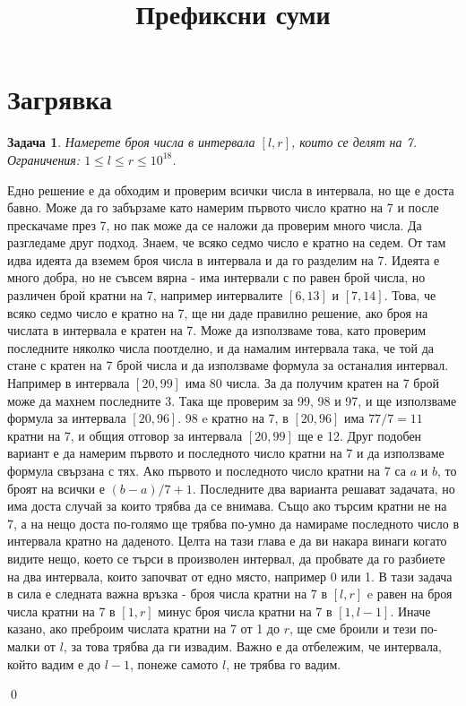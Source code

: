 \documentclass[]{article}
\title{Префиксни суми}
\author{}
\newtheorem{problem}{Задача}
\newenvironment{solution}{\noindent{\bf Решение.}\hspace*{1em}}{\qed\par}
\begin{document}
\maketitle

\section{Загрявка}
\begin{problem}
Намерете броя числа в интервала $[l, r]$, които се делят на 7.\newline
Ограничения: $1\leq l\leq r\leq 10^{18}$.
\end{problem}
\begin{solution}
\newline
Едно решение е да обходим и проверим всички числа в интервала, но ще е доста бавно. Може да го забързаме като намерим първото число кратно на 7 и после прескачаме през 7, но пак може да се наложи да проверим много числа.\newline
Да разгледаме друг подход. Знаем, че всяко седмо число е кратно на седем. От там идва идеята да вземем броя числа в интервала и да го разделим на 7. Идеята е много добра, но не съвсем вярна - има интервали с по равен брой числа, но различен брой кратни на 7, например интервалите $[6,13]$ и $[7,14]$. Това, че всяко седмо число е кратно на 7, ще ни даде правилно решение, ако броя на числата в интервала е кратен на 7.
Може да използваме това, като проверим последните няколко числа поотделно, и да намалим интервала така, че той да стане с кратен на 7 брой числа и да използваме формула за останалия интервал. Например в интервала $[20,99]$ има 80 числа. За да получим кратен на 7 брой може да махнем последните 3. Така ще проверим за 99, 98 и 97, и ще използваме формула за интервала $[20,96]$. 98 e кратно на 7, в $[20,96]$ има $77/7=11$ кратни на 7, и общия отговор за интервала $[20,99]$ ще е 12.\newline
Друг подобен вариант е да намерим първото и последното число кратни на 7 и да използваме формула свързана с тях. Ако първото и последното число кратни на 7 са $a$ и $b$, то броят на всички е $(b-a)/7+1$.\newline
Последните два варианта решават задачата, но има доста случай за които трябва да се внимава. Също ако търсим кратни не на 7, а на нещо доста по-голямо ще трябва по-умно да намираме последното число в интервала кратно на даденото.\newline
Целта на тази глава е да ви накара винаги когато видите нещо, което се търси в произволен интервал, да пробвате да го разбиете на два интервала, които започват от едно място, например 0 или 1. В тази задача в сила е следната важна връзка - броя числа кратни на 7 в $[l,r]$ e равен на броя числа кратни на 7 в $[1,r]$ минус броя числа кратни на 7 в $[1,l-1]$. Иначе казано, ако преброим числата кратни на 7 от 1 до $r$, ще сме броили и тези по-малки от $l$, за това трябва да ги извадим. Важно е да отбележим, че интервала, който вадим е до $l-1$, понеже самото $l$, не трябва го вадим.\newline

\end{solution}
\end{document}
